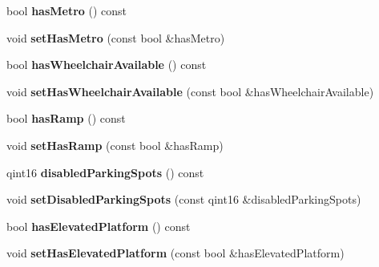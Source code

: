 \begin{DoxyCompactItemize}
bool {\bfseries has\+Metro} () const
\item 
\mbox{\label{classStationEngine_1_1Station_a108681c01bd97529f10fc19c40122910}} 
void {\bfseries set\+Has\+Metro} (const bool \&has\+Metro)
\item 
\mbox{\label{classStationEngine_1_1Station_a5f199ba2479501715c96d41ce27bc4c8}} 
bool {\bfseries has\+Wheelchair\+Available} () const
\item 
\mbox{\label{classStationEngine_1_1Station_a6cd5dbb113aedfd7fe6e46fdedb26e9b}} 
void {\bfseries set\+Has\+Wheelchair\+Available} (const bool \&has\+Wheelchair\+Available)
\item 
\mbox{\label{classStationEngine_1_1Station_a477fb013f192d1f7c0e6858008e42c0a}} 
bool {\bfseries has\+Ramp} () const
\item 
\mbox{\label{classStationEngine_1_1Station_a4a5bd6731d4f53284f92f4eb0487944f}} 
void {\bfseries set\+Has\+Ramp} (const bool \&has\+Ramp)
\item 
\mbox{\label{classStationEngine_1_1Station_a462fa31e61a725a498055b3fcba8cce5}} 
qint16 {\bfseries disabled\+Parking\+Spots} () const
\item 
\mbox{\label{classStationEngine_1_1Station_a2b3e193aee01e6379e8f91b27172f391}} 
void {\bfseries set\+Disabled\+Parking\+Spots} (const qint16 \&disabled\+Parking\+Spots)
\item 
\mbox{\label{classStationEngine_1_1Station_a406d35e41d5d6aa21d1d6270315b0020}} 
bool {\bfseries has\+Elevated\+Platform} () const
\item 
\mbox{\label{classStationEngine_1_1Station_a3c7125cae3e2524e3ebab483d607c952}} 
void {\bfseries set\+Has\+Elevated\+Platform} (const bool \&has\+Elevated\+Platform)
\item 
\mbox{\label{classStationEngine_1_1Station_ab89210b5f7e821c7b426022328d33871}} 

\end{DoxyCompactItemize}
